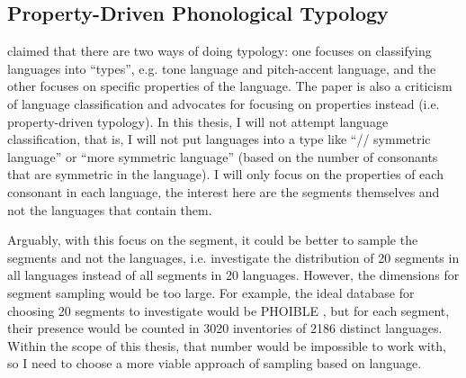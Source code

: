 \subsection{Property-Driven Phonological Typology}

\citet{hyman2009not} claimed that there are two ways of doing typology: one focuses on classifying languages into ``types'', e.g. tone language and pitch-accent language, and the other focuses on specific properties of the language. The paper is also a criticism of language classification and advocates for focusing on properties instead (i.e. property-driven typology). In this thesis, I will not attempt language classification, that is, I will not put languages into a type like ``// symmetric language'' or ``more symmetric language'' (based on the number of consonants that are symmetric in the language). I will only focus on the properties of each consonant in each language, the interest here are the segments themselves and not the languages that contain them. 

\par
Arguably, with this focus on the segment, it could be better to sample the segments and not the languages, i.e. investigate the distribution of 20 segments in all languages instead of all segments in 20 languages. However, the dimensions for segment sampling would be too large. For example, the ideal database for choosing 20 segments to investigate would be PHOIBLE \citep{phoible}, but for each segment, their presence would be counted in 3020 inventories of 2186 distinct languages. Within the scope of this thesis, that number would be impossible to work with, so I need to choose a more viable approach of sampling based on language.  
